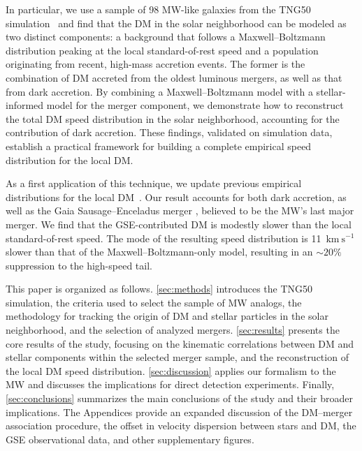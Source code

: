 \documentclass[twocolumn,tighten,twocolappendix]{aastex701}
\newcommand{\kms}{\ensuremath{\text{km}~\text{s}^{-1}}}
\newcommand{\osim}{\mathord{\sim}}
\begin{document}
In particular, we use a sample of 98 MW-like galaxies from the TNG50 simulation~\citep{2019MNRAS.490.3196P,2019MNRAS.490.3234N} and find that the DM in the solar neighborhood can be modeled as two distinct components: a background that follows a Maxwell--Boltzmann distribution peaking at the local standard-of-rest speed and a population originating from recent, high-mass accretion events.  The former is the combination of DM accreted from the oldest luminous mergers, as well as that from dark accretion.  By combining a Maxwell--Boltzmann model with a stellar-informed model for the merger component, we demonstrate how to reconstruct the total DM speed distribution in the solar neighborhood, accounting for the contribution of dark accretion. These findings, validated on simulation data, establish a practical framework for building a complete empirical speed distribution for the local DM. 

As a first application of this technique, we update previous empirical distributions for the local DM~\citep{2019ApJ...874....3N, 2024ApJ...974..167Z}.  Our result accounts for both dark accretion, as well as the Gaia Sausage--Enceladus merger \citep[GSE;][]{2018MNRAS.478..611B,2018Natur.563...85H}, believed to be the MW's last major merger. We find that the GSE-contributed DM is modestly slower than the local standard-of-rest speed. The mode of the resulting speed distribution is 11~\kms{} slower than that of the Maxwell--Boltzmann-only model, resulting in an $\osim20\%$ suppression to the high-speed tail.

This paper is organized as follows. \autoref{sec:methods} introduces the TNG50 simulation, the criteria used to select the sample of MW analogs, the methodology for tracking the origin of DM and stellar particles in the solar neighborhood, and the selection of analyzed mergers. \autoref{sec:results} presents the core results of the study, focusing on the kinematic correlations between DM and stellar components within the selected merger sample, and the reconstruction of the local DM speed distribution. \autoref{sec:discussion} applies our formalism to the MW and discusses the implications for direct detection experiments. Finally, \autoref{sec:conclusions} summarizes the main conclusions of the study and their broader implications. The Appendices provide an expanded discussion of the DM--merger association procedure, the offset in velocity dispersion between stars and DM, the GSE observational data, and other supplementary figures.

\end{document}
